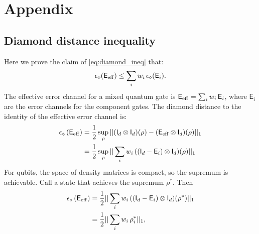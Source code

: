 \documentclass[aps,nofootinbib,pra,notitlepage,twocolumn]{revtex4-1}
\begin{document}
\newpage
\section{Appendix}
\label{sec:appendix}

\subsection{Diamond distance inequality}
\label{sub:diamond_distance_inequality}
Here we prove the claim of \eqref{eq:diamond_ineq} that:
\begin{equation}
	\epsilon_\diamond\!\left(\mathsf{E}_{\rm eff}\right) \le \sum_i w_i \, \epsilon_\diamond(\mathsf{E}_i).
\end{equation}
The effective error channel for a mixed quantum gate is $\mathsf{E}_{\rm{eff}} = \sum_i w_i\,\mathsf{E}_i$, where $\mathsf{E}_i$ are the error channels for the component gates. The diamond distance to the identity of the effective error channel is:
\begin{align}
	\epsilon_\diamond \left(\mathsf{E}_{\rm eff}\right)
		&= \frac{1}{2} \sup_\rho \vert \vert (\mathsf{I}_d\otimes \mathsf{I}_d)(\rho) 
										  - (\mathsf{E}_{\rm eff} \otimes \mathsf{I}_d)(\rho) \vert\vert_1\\
		&= \frac{1}{2} \sup_\rho \vert \vert \sum_i w_i\,((\mathsf{I}_d
										  - \mathsf{E}_i) \otimes \mathsf{I}_d)(\rho) \vert\vert_1
\end{align}
For qubits, the space of density matrices is compact, so the supremum is achievable. Call a state that achieves the supremum $\rho^*$. Then 
\begin{align}
	\epsilon_\diamond \left(\mathsf{E}_{\rm eff}\right)
		&= \frac{1}{2} \vert \vert \sum_i w_i\,((\mathsf{I}_d
										  - \mathsf{E}_i) \otimes \mathsf{I}_d)(\rho^*) \vert\vert_1 \\
		&= \frac{1}{2} \vert \vert \sum_i w_i\, \rho^*_i \vert\vert_1,
\end{align}
\end{document}
